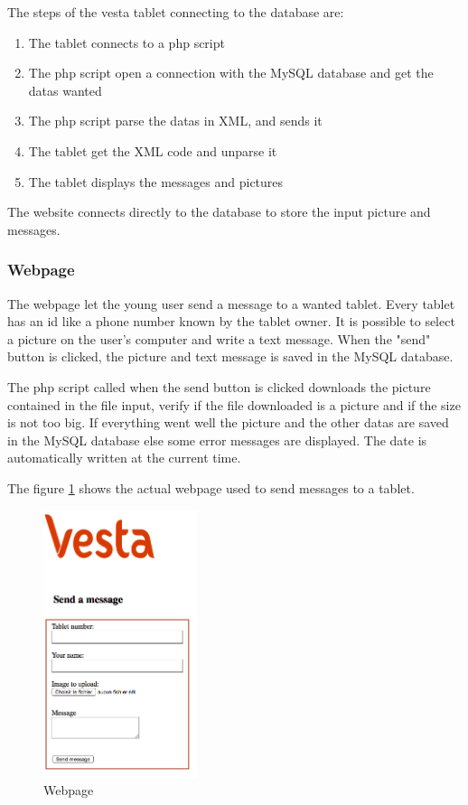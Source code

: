 The steps of the vesta tablet connecting to the database are:
\begin{enumerate}
\item{The tablet connects to a php script}
\item{The php script open a connection with the MySQL database and get the datas wanted}
\item{The php script parse the datas in XML, and sends it}
\item{The tablet get the XML code and unparse it}
\item{The tablet displays the messages and pictures}
\end{enumerate}

The website connects directly to the database to store the input picture and messages.

\clearpage

\subsubsection{Webpage}
The webpage let the young user send a message to a wanted tablet. Every tablet has an id like a phone number known by the tablet owner. It is possible to select a picture on the user's computer and write a text message. When the "send" button is clicked, the picture and text message is saved in the MySQL database.

The php script called when the send button is clicked downloads the picture contained in the file input, verify if the file downloaded is a picture and if the size is not too big. If everything went well the picture and the other datas are saved in the MySQL database else some error messages are displayed. The date is automatically written at the current time.

The figure \ref{fig:webpage} shows the actual webpage used to send messages to a tablet.
\begin{figure}[!htb]
    \centering
    \includegraphics[width=0.4\textwidth,keepaspectratio]{chap/softFig/web_front_page.png}
    \caption{Webpage}
    \label{fig:webpage}
\end{figure}

